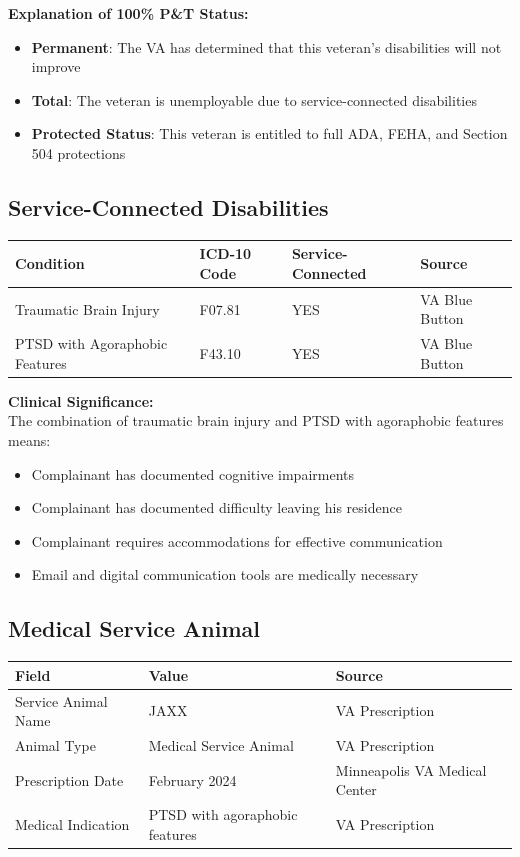 \documentclass[12pt,letterpaper]{article}
\begin{document}
\textbf{Explanation of 100\% P\&T Status:}
\begin{itemize}[noitemsep]
    \item \textbf{Permanent}: The VA has determined that this veteran's disabilities will not improve
    \item \textbf{Total}: The veteran is unemployable due to service-connected disabilities
    \item \textbf{Protected Status}: This veteran is entitled to full ADA, FEHA, and Section 504 protections
\end{itemize}

\subsection{Service-Connected Disabilities}

\begin{center}
\begin{tabular}{llll}
\toprule
\textbf{Condition} & \textbf{ICD-10 Code} & \textbf{Service-Connected} & \textbf{Source} \\
\midrule
Traumatic Brain Injury & F07.81 & YES & VA Blue Button \\
PTSD with Agoraphobic Features & F43.10 & YES & VA Blue Button \\
\bottomrule
\end{tabular}
\end{center}

\textbf{Clinical Significance:}\\
The combination of traumatic brain injury and PTSD with agoraphobic features means:
\begin{itemize}[noitemsep]
    \item Complainant has documented cognitive impairments
    \item Complainant has documented difficulty leaving his residence
    \item Complainant requires accommodations for effective communication
    \item Email and digital communication tools are medically necessary
\end{itemize}

\subsection{Medical Service Animal}

\begin{center}
\begin{tabular}{lll}
\toprule
\textbf{Field} & \textbf{Value} & \textbf{Source} \\
\midrule
Service Animal Name & JAXX & VA Prescription \\
Animal Type & Medical Service Animal & VA Prescription \\
Prescription Date & February 2024 & Minneapolis VA Medical Center \\
Medical Indication & PTSD with agoraphobic features & VA Prescription \\
\bottomrule
\end{tabular}
\end{center}
\end{document}
